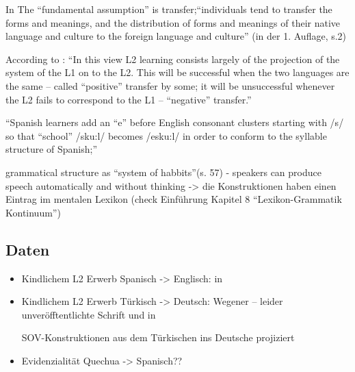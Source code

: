 In \cite{Lado71} The ``fundamental assumption'' is transfer;``individuals tend to transfer the forms and meanings, and the distribution of forms and meanings of their native language and culture to the foreign language and culture'' (in der 1. Auflage, s.2)

According to \cite{Cook93}: ``In this view L2 learning consists largely of the projection of the system of the L1 on to the L2.
This will be successful when the two languages are the same -- called ``positive'' transfer by some;
it will be unsuccessful whenever the L2 fails to correspond to the L1 -- ``negative'' transfer.''

``Spanish learners add an ``e'' before English consonant clusters starting with /s/ so that ``school'' /sku:l/ becomes /esku:l/ in order to conform to the syllable structure of Spanish;''

grammatical structure as ``system of habbits''(s. 57) - speakers can produce speech automatically and without thinking -> die Konstruktionen haben einen Eintrag im mentalen Lexikon (check Einführung \cite{Ziem13} Kapitel 8 ``Lexikon-Grammatik Kontinuum'')

\subsection{Daten}
\begin{itemize}
    \item Kindlichem L2 Erwerb Spanisch -> Englisch: \cite{Wong-Fillmore76} in \cite{Haberzettl06}
    \item Kindlichem L2 Erwerb Türkisch -> Deutsch: Wegener\cite{} -- leider unveröfftentlichte Schrift
und \cite{Haberzettl05} in \cite{Haberzettl06}

SOV-Konstruktionen aus dem Türkischen ins Deutsche projiziert

    \item Evidenzialität Quechua -> Spanisch??
\end{itemize}
